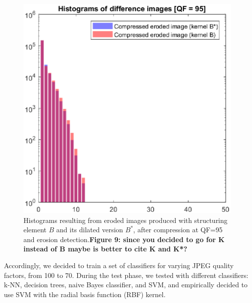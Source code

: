 \documentclass{ieeeaccess}
\begin{document}
\begin{figure}[t!]
	\centering
	\includegraphics[width=\linewidth]{hist_ero_ero_albero.eps}
	\caption{Histograms resulting from eroded images produced with structuring element $B$ and its dilated version $B^*$, after compression at QF=95 and erosion detection.\textbf{Figure 9: since you decided to go for K instead of B maybe is better to cite K and K*?}}
	\label{fig:hist_ero_ero_albero}
\end{figure}

Accordingly, we decided to train a set of classifiers for varying JPEG quality factors, from 100 to 70. During the test phase, we tested with different classifiers: k-NN, decision trees, naive Bayes classifier, and SVM, and empirically decided to use SVM with the radial basis function (RBF) kernel. 
\end{document}
